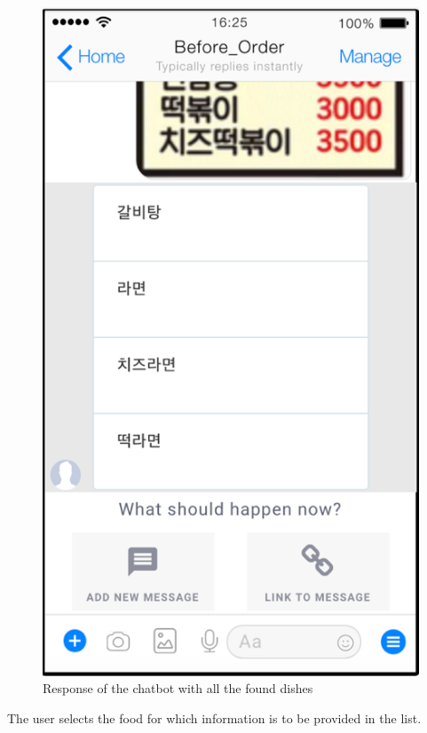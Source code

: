 \begin{figure}[htbp]
\centerline{\includegraphics[width=\linewidth]{./pictures/facebook_response}}
\caption{Response of the chatbot with all the found dishes}
\label{fig:facebook_response}
\end{figure}
\FloatBarrier

The user selects the food for which information is to be provided in the list.

